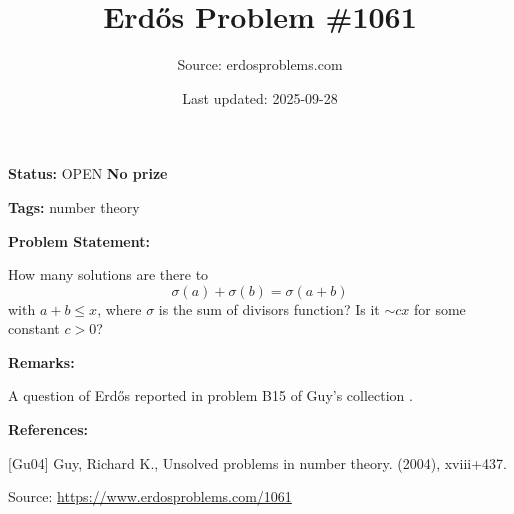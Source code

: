 \documentclass{article}
\title{Erd\H{o}s Problem \#1061}
\date{Last updated: 2025-09-28}
\author{Source: erdosproblems.com}
\begin{document}
\maketitle

\noindent\textbf{Status:} OPEN \quad \textbf{No prize}

\noindent\textbf{Tags:} number theory

\medskip
\noindent\textbf{Problem Statement:}

How many solutions are there to\[\sigma(a)+\sigma(b)=\sigma(a+b)\]with $a+b\leq x$, where $\sigma$ is the sum of divisors function? Is it $\sim cx$ for some constant $c>0$?

\bigskip
\noindent\textbf{Remarks:}

A question of Erd\H{o}s reported in problem B15 of Guy's collection \cite{Gu04}.

\bigskip
\noindent\textbf{References:}

[Gu04] Guy, Richard K., Unsolved problems in number theory. (2004), xviii+437.

\bigskip
\noindent\small{Source: \url{https://www.erdosproblems.com/1061}}
\end{document}
